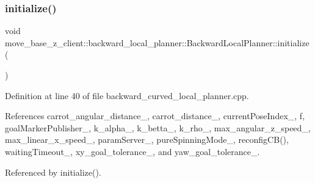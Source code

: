 \subsubsection{\texorpdfstring{initialize()}{initialize()}\hspace{0.1cm}{\footnotesize\ttfamily [3/3]}}
{\footnotesize\ttfamily void move\+\_\+base\+\_\+z\+\_\+client\+::backward\+\_\+local\+\_\+planner\+::\+Backward\+Local\+Planner\+::initialize (\begin{DoxyParamCaption}{ }\end{DoxyParamCaption})}



Definition at line 40 of file backward\+\_\+curved\+\_\+local\+\_\+planner.\+cpp.



References carrot\+\_\+angular\+\_\+distance\+\_\+, carrot\+\_\+distance\+\_\+, current\+Pose\+Index\+\_\+, f, goal\+Marker\+Publisher\+\_\+, k\+\_\+alpha\+\_\+, k\+\_\+betta\+\_\+, k\+\_\+rho\+\_\+, max\+\_\+angular\+\_\+z\+\_\+speed\+\_\+, max\+\_\+linear\+\_\+x\+\_\+speed\+\_\+, param\+Server\+\_\+, pure\+Spinning\+Mode\+\_\+, reconfig\+C\+B(), waiting\+Timeout\+\_\+, xy\+\_\+goal\+\_\+tolerance\+\_\+, and yaw\+\_\+goal\+\_\+tolerance\+\_\+.



Referenced by initialize().


